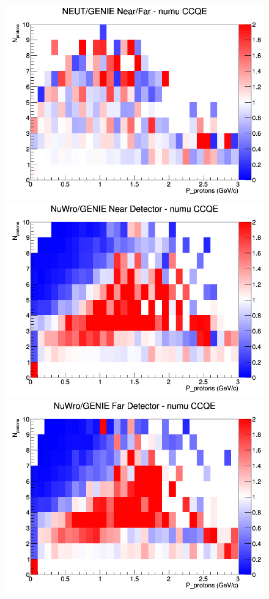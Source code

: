 \begin{figure}[h]
\endminipage
{}
\includegraphics[width=\linewidth]{N_P/nominal/protons/ratios/CCQE_NEUT_GENIE_numu_NF_N_P.png}
\endminipage
\newline
{}
\includegraphics[width=\linewidth]{N_P/nominal/protons/ratios/CCQE_NuWro_GENIE_numu_near_N_P.png}
\endminipage
{}
\includegraphics[width=\linewidth]{N_P/nominal/protons/ratios/CCQE_NuWro_GENIE_numu_far_N_P.png}

\end{figure}

